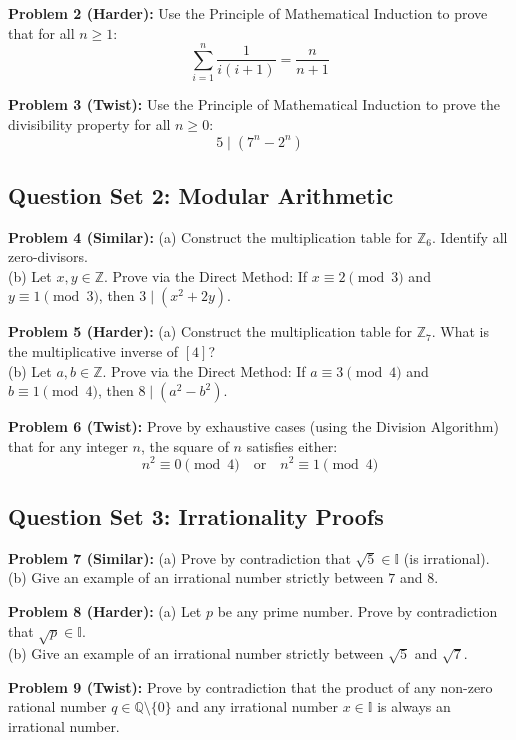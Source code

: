 \documentclass{article}
\begin{document}
\noindent\textbf{Problem 2 (Harder):} Use the Principle of Mathematical Induction to prove that for all $n \ge 1$:
\[ \sum_{i=1}^n \frac{1}{i(i+1)} = \frac{n}{n+1} \]

\noindent\textbf{Problem 3 (Twist):} Use the Principle of Mathematical Induction to prove the divisibility property for all $n \ge 0$:
\[ 5 \mid (7^n - 2^n) \]

\subsection{Question Set 2: Modular Arithmetic}
\noindent\textbf{Problem 4 (Similar):} 
(a) Construct the multiplication table for $\mathbb{Z}_6$. Identify all zero-divisors. \\
(b) Let $x, y \in \mathbb{Z}$. Prove via the Direct Method: If $x \equiv 2 \pmod 3$ and $y \equiv 1 \pmod 3$, then $3 \mid (x^2 + 2y)$.

\noindent\textbf{Problem 5 (Harder):} 
(a) Construct the multiplication table for $\mathbb{Z}_7$. What is the multiplicative inverse of $[4]$? \\
(b) Let $a, b \in \mathbb{Z}$. Prove via the Direct Method: If $a \equiv 3 \pmod 4$ and $b \equiv 1 \pmod 4$, then $8 \mid (a^2 - b^2)$.

\noindent\textbf{Problem 6 (Twist):} 
Prove by exhaustive cases (using the Division Algorithm) that for any integer $n$, the square of $n$ satisfies either:
\[ n^2 \equiv 0 \pmod 4 \quad \text{or} \quad n^2 \equiv 1 \pmod 4 \]

\subsection{Question Set 3: Irrationality Proofs}
\noindent\textbf{Problem 7 (Similar):} 
(a) Prove by contradiction that $\sqrt{5} \in \mathbb{I}$ (is irrational). \\
(b) Give an example of an irrational number strictly between $7$ and $8$.

\noindent\textbf{Problem 8 (Harder):} 
(a) Let $p$ be any prime number. Prove by contradiction that $\sqrt{p} \in \mathbb{I}$. \\
(b) Give an example of an irrational number strictly between $\sqrt{5}$ and $\sqrt{7}$.

\noindent\textbf{Problem 9 (Twist):} 
Prove by contradiction that the product of any non-zero rational number $q \in \mathbb{Q} \setminus \{0\}$ and any irrational number $x \in \mathbb{I}$ is always an irrational number.
\end{document}
